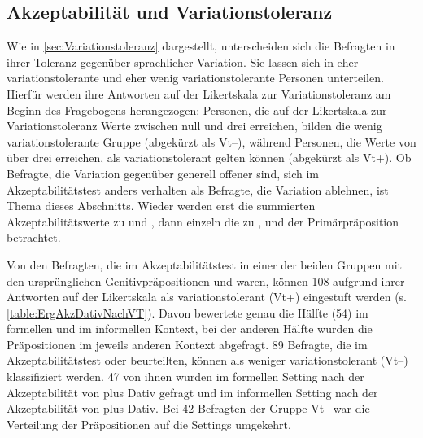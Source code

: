 \subsection{Akzeptabilität und Variationstoleranz}
\label{sec:ErgAkzNachVT}
Wie in \autoref{sec:Variationstoleranz} dargestellt, unterscheiden sich die Befragten in ihrer Toleranz gegenüber sprachlicher Variation. 
Sie lassen sich in eher variationstolerante und eher wenig variationstolerante Personen unterteilen. 
Hierfür werden ihre Antworten auf der Likertskala zur Variationstoleranz am Beginn des Fragebogens herangezogen: 
Personen, die auf der Likertskala zur Variationstoleranz Werte zwischen null und drei erreichen, bilden die wenig variationstolerante Gruppe (abgekürzt als Vt--), während Personen, die Werte von über drei erreichen, als variationstolerant gelten können (abgekürzt als Vt+). 
Ob Befragte, die Variation gegenüber generell offener sind, sich im Akzeptabilitätstest anders verhalten als Befragte, die Variation ablehnen, ist Thema dieses Abschnitts. 
Wieder werden erst die summierten Akzeptabilitätswerte zu \wegen{} und \waehrend{}, dann einzeln die zu \dank{}, \gegenueber{} und der Primärpräposition  betrachtet. 

Von den Befragten, die im Akzeptabilitätstest in einer der beiden Gruppen mit den ursprünglichen Genitivpräpositionen \wegen{} und \waehrend{} waren, können 108 aufgrund ihrer Antworten auf der Likertskala als variationstolerant (Vt+) eingestuft werden (s. \autoref{table:ErgAkzDativNachVT}).
Davon bewertete genau die Hälfte (54) \wegen{} im formellen und \waehrend{} im informellen Kontext, bei der anderen Hälfte wurden die Präpositionen im jeweils anderen Kontext abgefragt. 
89 Befragte, die im Akzeptabilitätstest \wegen{} oder \waehrend{} beurteilten, können als weniger variationstolerant (Vt--) klassifiziert werden.
47 von ihnen wurden im formellen Setting nach der Akzeptabilität von \wegen{} plus Dativ gefragt und im informellen Setting nach der Akzeptabilität von \waehrend{} plus Dativ. 
Bei 42 Befragten der Gruppe Vt-- war die Verteilung der Präpositionen auf die Settings umgekehrt. 


